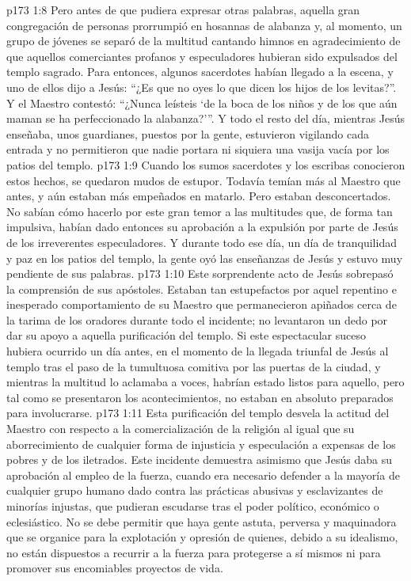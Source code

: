 \vs p173 1:8 Pero antes de que pudiera expresar otras palabras, aquella gran congregación de personas prorrumpió en hosannas de alabanza y, al momento, un grupo de jóvenes se separó de la multitud cantando himnos en agradecimiento de que aquellos comerciantes profanos y especuladores hubieran sido expulsados del templo sagrado. Para entonces, algunos sacerdotes habían llegado a la escena, y uno de ellos dijo a Jesús: “¿Es que no oyes lo que dicen los hijos de los levitas?”. Y el Maestro contestó: “¿Nunca leísteis ‘de la boca de los niños y de los que aún maman se ha perfeccionado la alabanza?’”. Y todo el resto del día, mientras Jesús enseñaba, unos guardianes, puestos por la gente, estuvieron vigilando cada entrada y no permitieron que nadie portara ni siquiera una vasija vacía por los patios del templo.
\vs p173 1:9 \pc Cuando los sumos sacerdotes y los escribas conocieron estos hechos, se quedaron mudos de estupor. Todavía temían más al Maestro que antes, y aún estaban más empeñados en matarlo. Pero estaban desconcertados. No sabían cómo hacerlo por este gran temor a las multitudes que, de forma tan impulsiva, habían dado entonces su aprobación a la expulsión por parte de Jesús de los irreverentes especuladores. Y durante todo ese día, un día de tranquilidad y paz en los patios del templo, la gente oyó las enseñanzas de Jesús y estuvo muy pendiente de sus palabras.
\vs p173 1:10 Este sorprendente acto de Jesús sobrepasó la comprensión de sus apóstoles. Estaban tan estupefactos por aquel repentino e inesperado comportamiento de su Maestro que permanecieron apiñados cerca de la tarima de los oradores durante todo el incidente; no levantaron un dedo por dar su apoyo a aquella purificación del templo. Si este espectacular suceso hubiera ocurrido un día antes, en el momento de la llegada triunfal de Jesús al templo tras el paso de la tumultuosa comitiva por las puertas de la ciudad, y mientras la multitud lo aclamaba a voces, habrían estado listos para aquello, pero tal como se presentaron los acontecimientos, no estaban en absoluto preparados para involucrarse.
\vs p173 1:11 Esta purificación del templo desvela la actitud del Maestro con respecto a la comercialización de la religión al igual que su aborrecimiento de cualquier forma de injusticia y especulación a expensas de los pobres y de los iletrados. Este incidente demuestra asimismo que Jesús daba su aprobación al empleo de la fuerza, cuando era necesario defender a la mayoría de cualquier grupo humano dado contra las prácticas abusivas y esclavizantes de minorías injustas, que pudieran escudarse tras el poder político, económico o eclesiástico. No se debe permitir que haya gente astuta, perversa y maquinadora que se organice para la explotación y opresión de quienes, debido a su idealismo, no están dispuestos a recurrir a la fuerza para protegerse a sí mismos ni para promover sus encomiables proyectos de vida.

